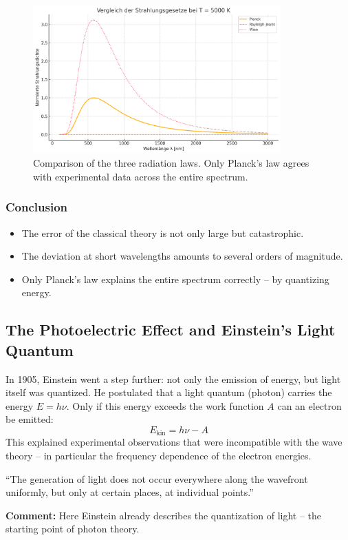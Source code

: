\begin{figure}[H]
	\centering
	\includegraphics[width=0.85\textwidth]{bilder/strahlungsgesetze.png}
	\caption{Comparison of the three radiation laws. Only Planck’s law agrees with experimental data across the entire spectrum.}
	\label{fig:strahlungsgesetze}
\end{figure}

\subsubsection{Conclusion}

\begin{itemize}
	\item The error of the classical theory is not only large but catastrophic.
	\item The deviation at short wavelengths amounts to several orders of magnitude.
	\item Only Planck’s law explains the entire spectrum correctly – by quantizing energy.
\end{itemize}
\subsection{The Photoelectric Effect and Einstein’s Light Quantum}

In 1905, Einstein went a step further: not only the emission of energy, but light itself was quantized. He postulated that a light quantum (photon) carries the energy \( E = h\nu \). Only if this energy exceeds the work function \( A \) can an electron be emitted:  
\[
E_{\text{kin}} = h\nu - A
\]
This explained experimental observations that were incompatible with the wave theory – in particular the frequency dependence of the electron energies.

\begin{tcolorbox}[physikbox, title={Einstein (1905)\cite{einstein_lichtquanten}}]
	\label{box:einstein-lichtquant}
	“The generation of light does not occur everywhere along the wavefront uniformly, but only at certain places, at individual points.”
	
	\textbf{Comment:} Here Einstein already describes the quantization of light – the starting point of photon theory.
\end{tcolorbox}
\vspace{1em}

